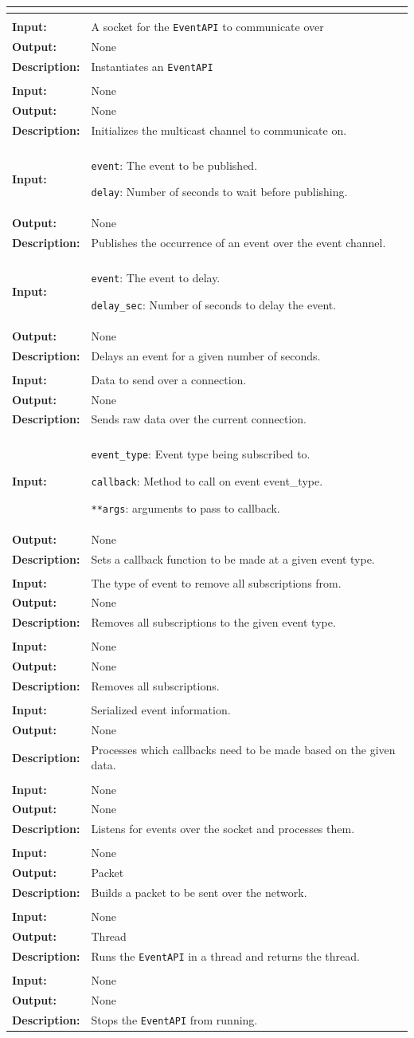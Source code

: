 \documentclass[titlepage]{article}
\renewenvironment{itemize*}
    {\begin{itemize}
        \setlength{\itemsep}{0pt}%
        \setlength{\parskip}{0pt}%
        \setlength{\partopsep}{0pt}%
        \setlength{\topsep}{0pt}}%
    {\end{itemize}}
\newcommand{\operations}[1]{
\begin{center}
    \begin{longtable}{|p{4cm}|p{10cm + 2.0\tabcolsep}|}
    \hline
    \multicolumn{2}{|l|}{\cellcolor[gray]{0.5}{\textbf{Operations}}} \\ \hline
#1
    \end{longtable}
\end{center}
}
\newcommand{\operation}[4]{
    \hline
    \multicolumn{2}{|l|}{\cellcolor[gray]{0.8}{\texttt{#1}}} \\ \hline
    \hspace{7pt}\textbf{Input:} & #2 \\ \hline
    \hspace{7pt}\textbf{Output:} & #3 \\ \hline
    \hspace{7pt}\textbf{Description:} & #4 \\ \hline
}
\begin{document}
\operations{
    \operation{\_\_init\_\_(tcp\_conn)}{A socket for the \texttt{EventAPI} to communicate over}{None}{Instantiates an \texttt{EventAPI}}
    \operation{\_setup\_mc()}{None}{None}{Initializes the multicast channel to communicate on.}
    \operation{publish(event,dealy\_sec)}
    {
        \begin{itemize*}
            \item \texttt{event}: The event to be published. 
            \item \texttt{delay}: Number of seconds to wait before publishing. 
        \end{itemize*}
    }{None}{Publishes the occurrence of an event over the event channel.}
    \operation{\_delay(event, delay\_sec)}
    {
        \begin{itemize*}
            \item \texttt{event}: The event to delay.
            \item \texttt{delay\_sec}: Number of seconds to delay the event. 
        \end{itemize*}
    }{None}{Delays an event for a given number of seconds.}
    \operation{push\_raw(raw)}{Data to send over a connection.}{None}{Sends raw data over the current connection.}
    \operation{subscribe(event\_type, callback, **args)}
    {
        \begin{itemize*}
            \item \texttt{event\_type}: Event type being subscribed to. 
            \item \texttt{callback}: Method to call on event event\_type.
            \item \texttt{**args}: arguments to pass to callback.
        \end{itemize*}
    }{None}{Sets a callback function to be made at a given event type.}
    \operation{unsubscribe\_all(event\_type)}{The type of event to remove all subscriptions from.}{None}{Removes all subscriptions to the given event type.}
    \operation{clear\_subscriptions()}{None}{None}{Removes all subscriptions.}
    \operation{\_process(data)}{Serialized event information.}{None}{Processes which callbacks need to be made based on the given data.}
    \operation{run()}{None}{None}{Listens for events over the socket and processes them.}
    \operation{\_tcp\_assemble()}{None}{Packet}{Builds a packet to be sent over the network.}
    \operation{start()}{None}{Thread}{Runs the \texttt{EventAPI} in a thread and returns the thread.}
    \operation{stop()}{None}{None}{Stops the \texttt{EventAPI} from running. }
}
    
\end{document}
